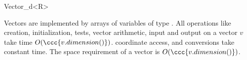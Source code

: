 \begin{ccRefClass}{Vector_d<R>}


\ccImplementation

Vectors are implemented by arrays of variables of type .  All
operations like creation, initialization, tests, vector arithmetic,
input and output on a vector $v$ take time $O(\ccc{v.dimension()})$.
coordinate access,  and conversions take constant
time.  The space requirement of a vector is $O(\ccc{v.dimension()})$.


\end{ccRefClass}


